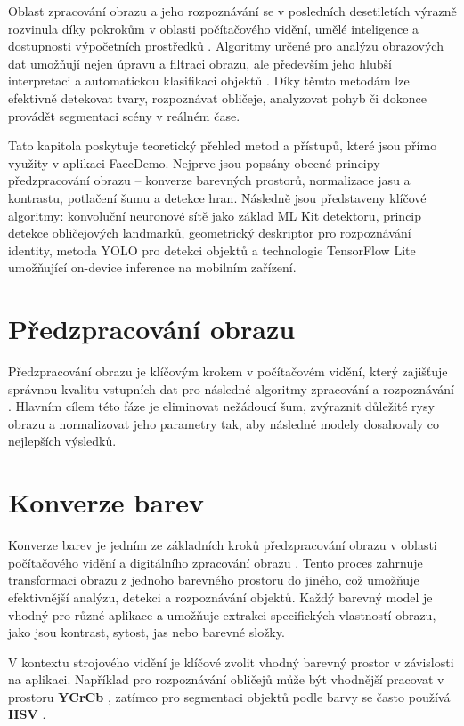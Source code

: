 \documentclass[FM,BP,CZ]{tulthesis}
\begin{document}
Oblast zpracování obrazu a jeho rozpoznávání se v posledních desetiletích výrazně rozvinula díky pokrokům v oblasti počítačového vidění, umělé inteligence a dostupnosti výpočetních prostředků \cite{gonzalez2018digital}. Algoritmy určené pro analýzu obrazových dat umožňují nejen úpravu a filtraci obrazu, ale především jeho hlubší interpretaci a automatickou klasifikaci objektů \cite{goodfellow2016deeplearning}. Díky těmto metodám lze efektivně detekovat tvary, rozpoznávat obličeje, analyzovat pohyb či dokonce provádět segmentaci scény v reálném čase.

Tato kapitola poskytuje teoretický přehled metod a přístupů, které jsou přímo využity v aplikaci FaceDemo. Nejprve jsou popsány obecné principy předzpracování obrazu – konverze barevných prostorů, normalizace jasu a kontrastu, potlačení šumu a detekce hran. Následně jsou představeny klíčové algoritmy: konvoluční neuronové sítě jako základ ML Kit detektoru, princip detekce obličejových landmarků, geometrický deskriptor pro rozpoznávání identity, metoda YOLO pro detekci objektů a technologie TensorFlow Lite umožňující on-device inference na mobilním zařízení.

\section{Předzpracování obrazu}
Předzpracování obrazu je klíčovým krokem v počítačovém vidění, který zajišťuje správnou kvalitu vstupních dat pro následné algoritmy zpracování a rozpoznávání \cite{gonzalez2018digital}. Hlavním cílem této fáze je eliminovat nežádoucí šum, zvýraznit důležité rysy obrazu a normalizovat jeho parametry tak, aby následné modely dosahovaly co nejlepších výsledků.
\newpage
\section{Konverze barev}
Konverze barev je jedním ze základních kroků předzpracování obrazu v oblasti počítačového vidění a digitálního zpracování obrazu \cite{gonzalez2018digital}. Tento proces zahrnuje transformaci obrazu z jednoho barevného prostoru do jiného, což umožňuje efektivnější analýzu, detekci a rozpoznávání objektů. Každý barevný model je vhodný pro různé aplikace a umožňuje extrakci specifických vlastností obrazu, jako jsou kontrast, sytost, jas nebo barevné složky.

V kontextu strojového vidění je klíčové zvolit vhodný barevný prostor v závislosti na aplikaci. Například pro rozpoznávání obličejů může být vhodnější pracovat v prostoru \textbf{YCrCb} \cite{wang2021survey}, zatímco pro segmentaci objektů podle barvy se často používá \textbf{HSV} \cite{gonzalez2018digital}.
\end{document}
